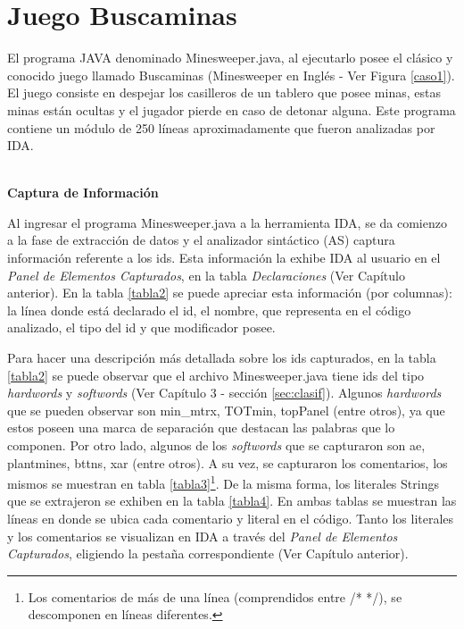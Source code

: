 \section{Juego Buscaminas}

El programa JAVA denominado Minesweeper.java, al ejecutarlo posee el clásico y conocido juego llamado Buscaminas (Minesweeper en Inglés - Ver Figura \ref{caso1}). El juego consiste en despejar los casilleros de un tablero que posee minas, estas minas están ocultas y el jugador pierde en caso de detonar alguna.
Este programa contiene un módulo de 250 líneas aproximadamente que fueron analizadas por IDA.

\noindent \textbf{\\Captura de Información\\} 

Al ingresar el programa Minesweeper.java a la herramienta IDA, se da comienzo a la fase de extracción de datos y el analizador sintáctico (AS) captura información referente a los ids. Esta información la exhibe IDA al usuario en el \textit{Panel de Elementos Capturados}, en la tabla \textit{Declaraciones} (Ver Capítulo anterior). En la tabla \ref{tabla2} se puede apreciar esta información (por columnas): la línea donde está declarado el id, el nombre, que representa en el código analizado, el tipo del id y que modificador posee.

Para hacer una descripción más detallada sobre los ids capturados, en la tabla \ref{tabla2} se puede observar que el archivo \mbox{Minesweeper.java}
tiene ids del tipo \textit{hardwords} y \textit{softwords} (Ver Capítulo 3 - sección \ref{sec:clasif}). Algunos \textit{hardwords} que se pueden observar son \textsf{min\_mtrx}, \textsf{TOTmin}, \textsf{topPanel} (entre otros), ya que estos poseen una marca de separación que destacan las palabras que lo componen. Por otro lado, algunos de los \textit{softwords} que se capturaron son \textsf{ae}, \textsf{plantmines}, \textsf{bttns}, \textsf{xar} (entre otros).
A su vez, se capturaron los comentarios, los mismos se muestran en tabla \ref{tabla3}\footnote[1]{Los comentarios de más de una línea (comprendidos entre /* */), se descomponen en líneas diferentes.}. De la misma forma, los literales Strings que se extrajeron se exhiben en la tabla \ref{tabla4}. En ambas tablas se muestran las líneas en donde se ubica cada comentario y literal en el código.
Tanto los literales y los comentarios se visualizan en IDA a través del \textit{Panel de Elementos Capturados}, eligiendo la pestaña correspondiente (Ver Capítulo anterior).

